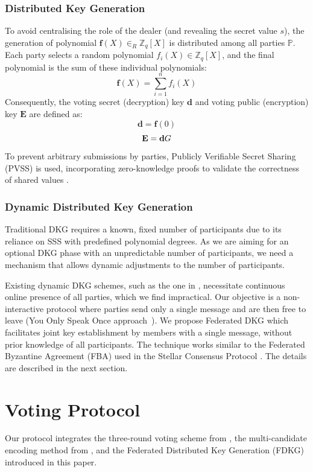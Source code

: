 \documentclass[runningheads]{llncs}
\begin{document}
\subsubsection*{Distributed Key Generation}
To avoid centralising the role of the dealer (and revealing the secret value $s$), the generation of polynomial $\mathbf{f}(X) \in_R \mathbb{Z}_q[X]$ is distributed among all parties $\mathbb{P}$. Each party selects a random polynomial $f_{i}(X) \in \mathbb{Z}_q[X]$, and the final polynomial is the sum of these individual polynomials: \[\mathbf{f}(X)=\sum_{i=1}^{n}f_i(X)\] Consequently, the voting secret (decryption) key $\mathbf{d}$ and voting public (encryption) key $\mathbf{E}$ are defined as: $$\mathbf{d}=\mathbf{f}(0)$$ $$\mathbf{E}=\mathbf{d} G$$ 
To prevent arbitrary submissions by parties, Publicly Verifiable Secret Sharing (PVSS) is used, incorporating zero-knowledge proofs to validate the correctness of shared values \cite{goosSimplePubliclyVerifiable1999}.

\subsubsection*{Dynamic Distributed Key Generation}
Traditional DKG requires a known, fixed number of participants due to its reliance on SSS with predefined polynomial degrees. As we are aiming for an optional DKG phase with an unpredictable number of participants, we need a mechanism that allows dynamic adjustments to the number of participants.

Existing dynamic DKG schemes, such as the one in \cite{delerableeDynamicThresholdPublickey2008}, necessitate continuous online presence of all parties, which we find impractical. Our objective is a non-interactive protocol where parties send only a single message and are then free to leave (You Only Speak Once approach~\cite{gentryYOSOYouOnly2021}). We propose Federated DKG which facilitates joint key establishment by members with a single message, without prior knowledge of all participants.
The technique works similar to the Federated Byzantine Agreement (FBA) used in the Stellar Consensus Protocol \cite{mazieresStellarConsensusProtocol2015}. The details are described in the next section.

\section{Voting Protocol}

Our protocol integrates the three-round voting scheme from \cite{schoenmakersLectureNotesCryptographic2018}, the multi-candidate encoding method from \cite{haoAnonymousVotingTworound2010}, and the Federated Distributed Key Generation (FDKG) introduced in this paper.
\end{document}
